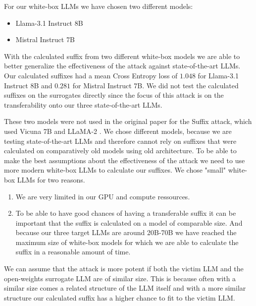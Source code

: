 \documentclass[11pt,a4paper,twocolumn]{article}
\begin{document}
	For our white-box LLMs we have chosen two different models:
	
	\begin{itemize}
		\item Llama-3.1 Instruct 8B
		
		\item Mistral Instruct 7B
	\end{itemize}
	
	With the calculated suffix from two different white-box models we are able to better generalize the effectiveness of the attack against state-of-the-art LLMs.
	Our calculated suffixes had a mean Cross Entropy loss of $1.048$ for Llama-3.1 Instruct 8B and $0.281$ for Mistral Instruct 7B.
	We did not test the calculated suffixes on the surrogates directly since the focus of this attack is on the transferability onto our three state-of-the-art LLMs.
	
	These two models were not used in the original paper for the Suffix attack, which used Vicuna 7B and LLaMA-2 \cite{zou2023universaltransferableadversarialattacks}.
	We chose different models, because we are testing state-of-the-art LLMs and therefore cannot rely on suffixes that were calculated on comparatively old models using old architecture.
	To be able to make the best assumptions about the effectiveness of the attack we need to use more modern white-box LLMs to calculate our suffixes.
	We chose "small" white-box LLMs for two reasons.
	
	\begin{enumerate}
		\item We are very limited in our GPU and compute ressources.
		
		\item To be able to have good chances of having a transferable suffix it can be important that the suffix is calculated on a model of comparable size. And because our three target LLMs are around 20B-70B we have reached the maximum size of white-box models for which we are able to calculate the suffix in a reasonable amount of time.
	\end{enumerate}
	
	We can assume that the attack is more potent if both the victim LLM and the open-weights surrogate LLM are of similar size.
	This is because often with a similar size comes a related structure of the LLM itself and with a more similar structure our calculated suffix has a higher chance to fit to the victim LLM.
	
	\bigskip
	
\end{document}
